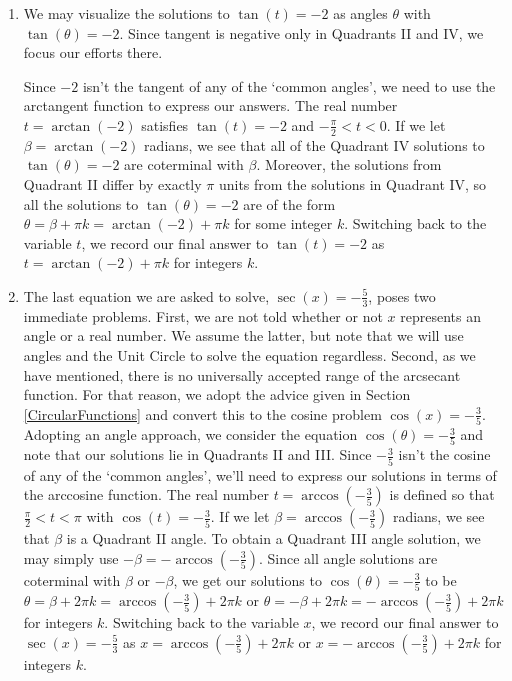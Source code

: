 {\begin{enumerate}
\item We may visualize the solutions to $\tan(t)=-2$ as angles $\theta$  with $\tan(\theta) = -2$.  Since tangent is negative only in Quadrants II and IV, we focus our efforts there. 




Since $-2$ isn't the tangent of any of the `common angles', we need to use the arctangent function to express our answers.  The real number $t = \arctan(-2)$ satisfies $\tan(t)=-2$  and $-\frac{\pi}{2} < t < 0$.   If we let $\beta = \arctan(-2)$ radians, we see that all of the Quadrant IV solutions to  $\tan(\theta) = -2$  are coterminal with $\beta$. Moreover, the solutions from Quadrant II differ by exactly $\pi$ units from the solutions in Quadrant IV, so all the solutions to $\tan(\theta) = -2$ are of the form $\theta = \beta + \pi k = \arctan(-2) + \pi k$ for some integer $k$.  Switching back to the variable $t$,  we record our final answer to $\tan(t) = -2$ as $t = \arctan(-2) + \pi k$ for integers $k$.


\item  The last equation we are asked to solve, $\sec(x) = -\frac{5}{3}$, poses two immediate problems.  First, we are not told whether or not $x$ represents an angle or a real number.  We assume the latter, but note that we will use angles and the Unit Circle to solve the equation regardless.  Second, as we have mentioned, there is no universally accepted range of the arcsecant function.  For that reason, we adopt the advice given in Section \ref{CircularFunctions} and convert this to the cosine problem $\cos(x) = -\frac{3}{5}$.  Adopting an angle approach, we consider the equation $\cos(\theta) = -\frac{3}{5}$ and note that our solutions lie in Quadrants II and III.  Since $-\frac{3}{5}$ isn't  the cosine of any of the `common angles', we'll need to express our solutions in terms of the arccosine function.  The real number $t = \arccos\left(-\frac{3}{5}\right)$ is defined so that $\frac{\pi}{2} < t < \pi$ with $\cos(t) = -\frac{3}{5}$.  If we let $\beta = \arccos\left(-\frac{3}{5}\right)$ radians, we see that $\beta$ is a Quadrant II angle.  To obtain a Quadrant III angle solution, we may simply use $-\beta = -\arccos\left(-\frac{3}{5}\right)$.  Since all angle solutions are coterminal with $\beta$ or $-\beta$, we get our solutions to $\cos(\theta) = -\frac{3}{5}$ to be $\theta = \beta + 2\pi k = \arccos\left(-\frac{3}{5}\right) + 2\pi k$ or $\theta = -\beta + 2\pi k = -\arccos\left(-\frac{3}{5}\right) + 2\pi k$ for integers $k$.  Switching back to the variable $x$,  we record our final answer to $\sec(x) = -\frac{5}{3}$ as $x = \arccos\left(-\frac{3}{5}\right) + 2\pi k$ or $x = -\arccos\left(-\frac{3}{5}\right) + 2\pi k$ for integers $k$.



\end{enumerate}}
